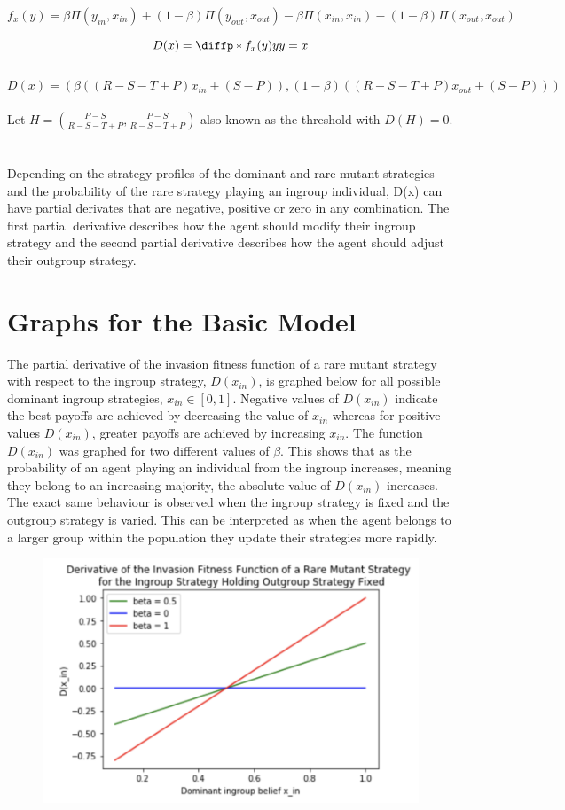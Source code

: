 \documentclass[]{llncs}
\begin{document}
\[
f_x(y) = \beta \Pi ( y_{in}, x_{in}) + (1-\beta) \Pi ( y_{out}, x_{out} )  - \beta \Pi ( x_{in}, x_{in}) - (1-\beta) \Pi ( x_{out}, x_{out} ) 
\]

\[
D(x) = \diffp*{f_x(y)}{y}{y=x}
\]
\\
\[
D(x) = (\beta((R - S - T + P) x_{in} + (S-P)), (1-\beta)((R - S - T + P) x_{out} + (S-P)))
\]
\\
Let $H = (\frac{P-S}{R - S - T +P}, \frac{P-S}{R - S - T +P}) $ also known as the threshold with $ D(H) = 0 $.\\
\\
\\
Depending on the strategy profiles of the dominant and rare mutant strategies and the probability of the rare strategy playing an ingroup individual, D(x) can have partial derivates that are negative, positive or zero in any combination. The first partial derivative describes how the agent should modify their ingroup strategy and the second partial derivative describes how the agent should adjust their outgroup strategy. 


\section{Graphs for the Basic Model}
The partial derivative of the invasion fitness function of a rare mutant strategy with respect to the ingroup strategy, $D(x_{in})$, is graphed below for all possible dominant ingroup strategies, $x_{in} \in [0,1]$. Negative values of $D(x_{in})$ indicate the best payoffs are achieved by decreasing the value of $x_{in} $ whereas for positive values $D(x_{in})$, greater payoffs are achieved by increasing  $x_{in} $. The function $D(x_{in})$ was graphed for two different values of $\beta$. This shows that as the probability of an agent playing an individual from the ingroup increases, meaning they belong to an increasing majority, the absolute value of $D(x_{in})$ increases. The exact same behaviour is observed when the ingroup strategy is fixed and the outgroup strategy is varied. This can be interpreted as when the agent belongs to a larger group within the population they update their strategies more rapidly. 

\begin{figure}
\centering
\includegraphics[width=12cm]{images/beta_ingroup_graph}
\end{figure}
\end{document}
